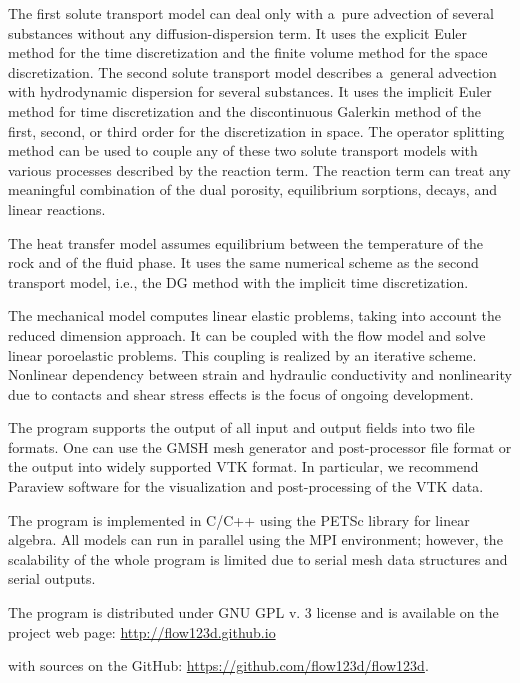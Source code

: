 The first solute transport model can deal only with a~pure advection of several substances without any diffusion-dispersion term. It uses
the explicit Euler method for the time discretization and the finite volume method for the space discretization.
The second solute transport model describes a~general advection with hydrodynamic dispersion for several substances.
It uses the implicit Euler method for time discretization and the discontinuous Galerkin method of
the first, second, or third order for the discretization in space.
The operator splitting method can be used to couple any of these two solute transport models with  
 various processes described by the reaction term. The reaction term can treat any meaningful combination of the dual porosity,
equilibrium sorptions, decays, and linear reactions.

The heat transfer model assumes equilibrium between the temperature of the rock and of the fluid phase. It uses the same numerical scheme as the second transport model, i.e., the DG method with the implicit time discretization.

The mechanical model computes linear elastic problems, taking into account the reduced dimension approach.
It can be coupled with the flow model and solve linear poroelastic problems. This coupling is realized by an iterative scheme. Nonlinear dependency between strain and hydraulic conductivity and nonlinearity due to contacts and shear stress effects is the focus of ongoing development.

The program supports the output of all input and output fields into two file formats. One can use the GMSH mesh generator and post-processor file format or the output into widely supported VTK format. In particular, we recommend Paraview software for the visualization and post-processing of the VTK data.

The program is implemented in C/C++ using the PETSc library for linear algebra. All models can run in parallel using the MPI environment; however, the scalability of the whole program is limited due to serial mesh data structures and serial outputs.


The program is distributed under GNU GPL v. 3 license and is available on the project web page:
\url{http://flow123d.github.io}

with sources on the GitHub:
\url{https://github.com/flow123d/flow123d}.


